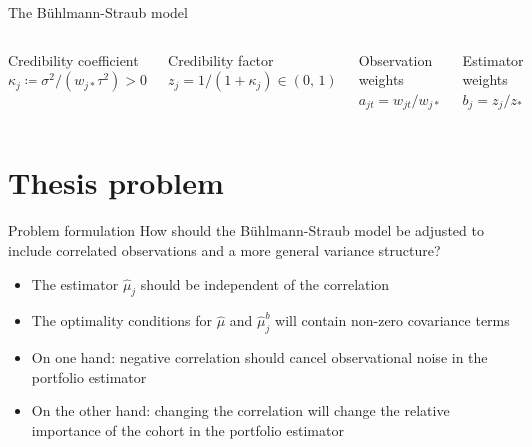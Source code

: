 \documentclass{beamer}
\begin{document}
\begin{frame}{The Bühlmann-Straub model} 

\begin{columns}
    \begin{block}{Credibility coefficient}
    $\kappa_j \coloneqq \sigma^2/(w_{j\ast}\tau^2)>0$
    \end{block}
    \begin{block}{Credibility factor}
    $z_j =  1/(1+\kappa_j) \in (0,\, 1)$
    \end{block}
    \begin{block}{Observation weights}
   $a_{jt}=w_{jt}/w_{j\ast}$
    \end{block}
    \begin{block}{Estimator weights}
   $b_j=z_j/z_\ast$
    \end{block}
\end{columns}
\end{frame}

\section{Thesis problem}


\begin{frame}{Problem formulation}
How should the Bühlmann-Straub model be adjusted to include correlated observations and a more general variance structure?

\pause

\vspace{0.5cm}

\begin{itemize}
    \item The estimator $\hat\mu_j$ should be independent of the correlation
    \item The optimality conditions for $\hat\mu$ and $\hat\mu_j^b$ will contain non-zero covariance terms
    \item On one hand: negative correlation should cancel observational noise in the portfolio estimator
    \item On the other hand: changing the correlation will change the relative importance of the cohort in the portfolio estimator
\end{itemize}

    
\end{frame}
\end{document}
